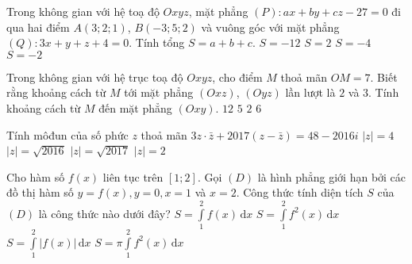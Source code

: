 \begin{ex}%
	Trong không gian với hệ toạ độ $Oxyz$, mặt phẳng $(P): ax+by+cz-27=0$ đi qua hai điểm $A(3;2;1)$, $B(-3;5;2)$ và vuông góc với mặt phẳng $(Q): 3x+y+z+4=0$. Tính tổng $S=a+b+c$. 
	\choice
	{\True $S=-12$}
	{$S=2$}
	{$S=-4$}
	{$S=-2$}
\end{ex}

\begin{ex}%
	Trong không gian với hệ trục toạ độ $Oxyz$, cho điểm $M$ thoả mãn $OM=7$. Biết rằng khoảng cách từ $M$ tới mặt phẳng $(Oxz)$, $(Oyz)$ lần lượt là $2$ và $3$. Tính khoảng cách từ $M$ đến mặt phẳng $(Oxy)$.
	\choice
	{$12$}
	{$5$}
	{$2$}
	{\True $6$}
\end{ex}

\begin{ex}%
	Tính môđun của số phức $z$ thoả mãn $3z\cdot \bar{z}+2017\left(z-\bar{z}\right)=48-2016i$
	\choice
	{\True $|z|=4$}
	{$|z|=\sqrt{2016}$}
	{$|z|=\sqrt{2017}$}
	{$|z|=2$}
\end{ex}

\begin{ex}%
	Cho hàm số $f(x)$ liên tục trên $\left[1;2\right]$. Gọi $(D)$ là hình phẳng giới hạn bởi các đồ thị hàm số $y=f(x), y=0, x=1$ và $x=2$. Công thức tính diện tích $S$ của $(D)$ là công thức nào dưới đây?
	\choice
	{$S=\displaystyle\int\limits_1^2f(x)\mathrm{\,d}x$}
	{$S=\displaystyle\int\limits_1^2f^2(x)\mathrm{\,d}x$}
	{\True $S=\displaystyle\int\limits_1^2\big|f(x)\big|\mathrm{\,d}x$}
	{$S=\pi\displaystyle\int\limits_1^2f^2(x)\mathrm{\,d}x$}
\end{ex}


